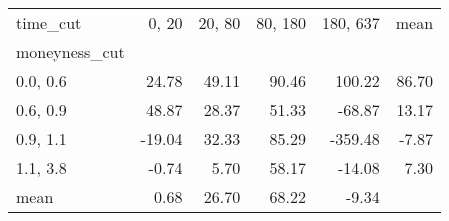 \begin{tabular}{lrrrrr}
\toprule
time\_cut &  0, 20 &  20, 80 &  80, 180 &  180, 637 &  mean \\
moneyness\_cut &          &           &            &             &       \\
\midrule
0.0, 0.6    &    24.78 &     49.11 &      90.46 &      100.22 & 86.70 \\
0.6, 0.9    &    48.87 &     28.37 &      51.33 &      -68.87 & 13.17 \\
0.9, 1.1    &   -19.04 &     32.33 &      85.29 &     -359.48 & -7.87 \\
1.1, 3.8    &    -0.74 &      5.70 &      58.17 &      -14.08 &  7.30 \\
mean          &     0.68 &     26.70 &      68.22 &       -9.34 &       \\
\bottomrule
\end{tabular}
